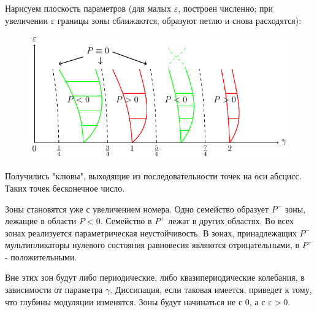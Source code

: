 Нарисуем плоскость параметров (для малых $\varepsilon$, построен численно; при увеличении $\varepsilon$ границы зоны сближаются, образуют петлю и снова расходятся):
\begin{figure}[H]
	\centering
	\includegraphics[width=0.5\linewidth]{fig/fig45.pdf}   
\end{figure}

Получились "клювы", выходящие из последовательности точек на оси абсцисс. Таких точек бесконечное число. 

Зоны становятся уже с увеличением номера. Одно семейство образует $P^-$ зоны, лежащие в области $P<0$. Семейство в $P^+$ лежат в других областях. Во всех зонах реализуется параметрическая неустойчивость. В зонах, принадлежащих $P^-$ мультипликаторы нулевого состояния равновесия являются отрицательными, в $P^+$ - положительными.  

Вне этих зон будут либо периодические, либо квазипериодические колебания, в зависимости от параметра $\gamma$. Диссипация, если таковая имеется, приведет к тому, что глубины модуляции изменятся. Зоны будут начинаться не с 0, а с $\varepsilon>0$. 